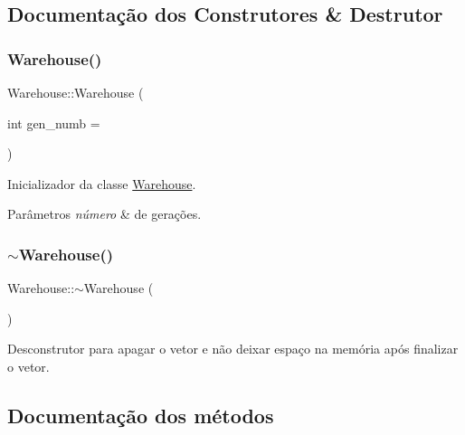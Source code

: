 \subsection{Documentação dos Construtores \& Destrutor}
\mbox{\label{classWarehouse_ad34dcb3f59757a52f9084a973779e536}} 
\subsubsection{\texorpdfstring{Warehouse()}{Warehouse()}}
{\footnotesize\ttfamily Warehouse\+::\+Warehouse (\begin{DoxyParamCaption}\item[{int}]{gen\+\_\+numb = {} }\end{DoxyParamCaption})\hspace{0.3cm}{\ttfamily [inline]}}

Inicializador da classe \hyperlink{classWarehouse}{Warehouse}. 
\begin{DoxyParams}{Parâmetros}
{\em número} & de gerações. \\
\hline
\end{DoxyParams}
\mbox{\label{classWarehouse_a2ff79dc26f107b668d2e5fa7b2eeafc4}} 
\subsubsection{\texorpdfstring{$\sim$\+Warehouse()}{~Warehouse()}}
{\footnotesize\ttfamily Warehouse\+::$\sim$\+Warehouse (\begin{DoxyParamCaption}{ }\end{DoxyParamCaption})\hspace{0.3cm}{\ttfamily [inline]}}



Desconstrutor para apagar o vetor e não deixar espaço na memória após finalizar o vetor. 



\subsection{Documentação dos métodos}
\mbox{\label{classWarehouse_a6ec18d658786c3f8f6577c31aac9481f}} 
